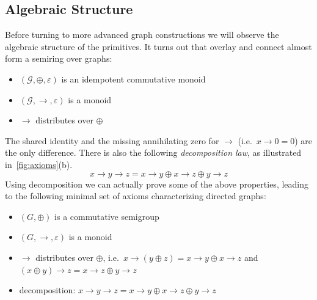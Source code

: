 \documentclass{article}
\renewcommand{\epsilon}{\varepsilon}
\newcommand{\eps}{\epsilon}
\newcommand{\overlay}{\oplus}
\newcommand{\connect}{\rightarrow}
\begin{document}
\subsection{Algebraic Structure}\label{sec:algebra}
Before turning to more advanced graph constructions we will observe the
algebraic structure of the primitives. It turns out that overlay and connect
almost form a semiring over graphs:
\begin{itemize}
\item $(\mathcal{G}, \overlay, \eps)$ is an idempotent commutative monoid
\item $(\mathcal{G}, \connect, \eps)$ is a monoid
\item $\connect$ distributes over $\overlay$
\end{itemize}
The shared identity and the missing annihilating zero for $\connect$
(i.e.\ $x \connect 0 = 0$) are the only difference. There is also the following
\textit{decomposition law}, as illustrated in~\autoref{fig:axioms}(b).
\[
  x \connect y \connect z = x \connect y \overlay x \connect z \overlay y \connect z
\]
Using decomposition we can actually prove some of the above properties, leading
to the following minimal set of axioms characterizing directed graphs:
\begin{itemize}
\item $(G, \overlay)$ is a commutative semigroup
\item $(G, \connect, \eps)$ is a monoid
\item $\connect$ distributes over $\overlay$, i.e.\ $x \connect (y \overlay z)
  = x \connect y \overlay x \connect z$ and $(x \overlay y) \connect z = x
  \connect z \overlay y \connect z$
\item decomposition: $x \connect y \connect z = x \connect y \overlay x
  \connect z \overlay y \connect z$ 
\end{itemize}
\end{document}
